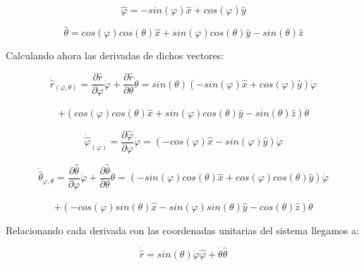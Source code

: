 \documentclass[12 pt]{article}
\begin{document}
\begin{equation*}
\hat{\varphi}= -sin(\varphi)\hat{x} + cos(\varphi) \hat{y}
\end{equation*}

\begin{equation*}
\hat{\theta}=  cos(\varphi)cos(\theta) \hat{x}+ sin(\varphi)cos(\theta)\hat{y}- sin(\theta)\hat{z}
\end{equation*}

Calculando ahora las derivadas de dichos vectores:

\begin{equation*}
\dot{\hat{r}}_{(\varphi, \theta)} = \frac{\partial \hat{r}}{\partial \varphi} \dot{\varphi} + \frac{\partial \hat{r}}{\partial \theta}\dot{\theta}  = sin(\theta) (-sin(\varphi)\hat{x} + cos(\varphi) \hat{y})\dot{\varphi}
\end{equation*}

\begin{equation*}
+ (cos(\varphi)cos(\theta) \hat{x}+ sin(\varphi)cos(\theta)\hat{y}- sin(\theta)\hat{z}) \dot{\theta}
\end{equation*}



\begin{equation*}
\dot{\hat{\varphi}}_{(\varphi)} = \frac{\partial \hat{\varphi}}{\partial \varphi}\dot{\varphi}= (-cos(\varphi) \hat{x} -sin(\varphi) \hat{y}) \dot{\varphi}
\end{equation*}



 \begin{equation*}
 \dot{\hat{\theta}}_{\varphi, \theta} = \frac{\partial \hat{\theta}}{\partial \varphi}\dot{\varphi} + \frac{\partial \hat{\theta}}{\partial \theta} \dot{\theta}= (-sin(\varphi)cos(\theta)\hat{x} + cos(\varphi)cos(\theta) \hat{y}) \dot{\varphi}
   \end{equation*}

\begin{equation*}
+ (-cos(\varphi) sin (\theta) \hat{x} -	sin (\varphi) sin(\theta) \hat{y} - cos(\theta)\hat{z})\dot{\theta}
\end{equation*}


Relacionando cada derivada con las coordenadas unitarias del sistema llegamos a:


 \begin{equation*}
 \dot{\hat{r}} = sin(\theta)\dot{\varphi} \hat{\varphi} + \dot{\theta}\hat{\theta}
 \end{equation*}
 
\end{document}
